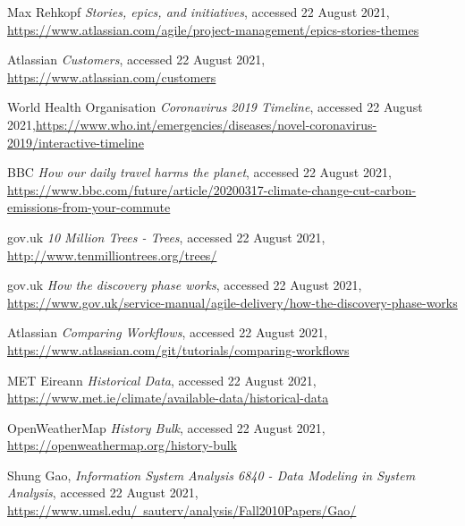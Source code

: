 \documentclass[]{UCD_CS_47360_Report}
\begin{document}
\begin{thebibliography}{99}
 Max Rehkopf \emph{Stories, epics, and initiatives}, accessed 22 August 2021, \href{https://www.atlassian.com/agile/project-management/epics-stories-themes}{https://www.atlassian.com/agile/project-management/epics-stories-themes}

 Atlassian \emph{Customers}, accessed 22 August 2021, \href{https://www.atlassian.com/customers}{https://www.atlassian.com/customers}

World Health Organisation \emph{Coronavirus 2019 Timeline}, accessed 22 August 2021,\href{https://www.who.int/emergencies/diseases/novel-coronavirus-2019/interactive-timeline}{https://www.who.int/emergencies/diseases/novel-coronavirus-2019/interactive-timeline}


BBC \emph{How our daily travel harms the planet}, accessed 22 August 2021, \href{https://www.bbc.com/future/article/20200317-climate-change-cut-carbon-emissions-from-your-commute}{https://www.bbc.com/future/article/20200317-climate-change-cut-carbon-emissions-from-your-commute}


gov.uk \emph{10 Million Trees - Trees}, accessed 22 August 2021, \href{http://www.tenmilliontrees.org/trees/}{http://www.tenmilliontrees.org/trees/}

gov.uk \emph{How the discovery phase works}, accessed 22 August 2021, \href{https://www.gov.uk/service-manual/agile-delivery/how-the-discovery-phase-works}{https://www.gov.uk/service-manual/agile-delivery/how-the-discovery-phase-works}


Atlassian \emph{Comparing Workflows}, accessed 22 August 2021, \href{https://www.atlassian.com/git/tutorials/comparing-workflows}{https://www.atlassian.com/git/tutorials/comparing-workflows} 

MET Eireann \emph{Historical Data}, accessed 22 August 2021, \href{https://www.met.ie/climate/available-data/historical-data}{https://www.met.ie/climate/available-data/historical-data}

OpenWeatherMap \emph{History Bulk}, accessed 22 August 2021, \href{https://openweathermap.org/history-bulk}{https://openweathermap.org/history-bulk}

Shung Gao,  \emph{Information System Analysis 6840 -  Data Modeling in System Analysis}, accessed 22 August 2021, \href{https://www.umsl.edu/~sauterv/analysis/Fall2010Papers/Gao/}{https://www.umsl.edu/~sauterv/analysis/Fall2010Papers/Gao/}


\end{thebibliography}
\end{document}
